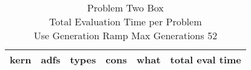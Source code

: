 \begin{table}[H]
\caption{Problem  Two Box \\Total Evaluation Time per Problem \\ Use Generation Ramp  Max Generations 52\\}
\begin{center}
\scalebox{1.0} %
{
\begin{tabular}{lllllr}
\hline
kern & adfs & types & cons & what & total eval time \\
\hline


\end{tabular}
}
\end{center}
\end{table}

